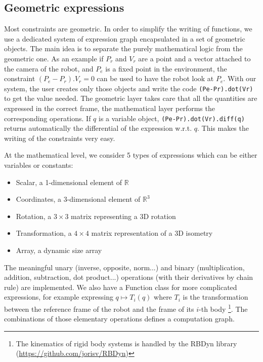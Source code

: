 \subsection{Geometric expressions}

Most constraints are geometric.
In order to simplify the writing of functions, we use a dedicated system of expression graph encapsulated in a set of geometric objects.
The main idea is to separate the purely mathematical logic from the geometric one. As an example if $P_r$ and $V_r$ are a point and a vector attached to the camera of the robot, and $P_e$ is a fixed point in the environment, the constraint $(P_e - P_r).V_r = 0$ can be used to have the robot look at $P_e$. With our system, the user creates only those objects and write the code {\tt (Pe-Pr).dot(Vr)} to get the value needed. The geometric layer takes care that all the quantities are expressed in the correct frame, the mathematical layer performs the corresponding operations. If $q$ is a variable object, {\tt (Pe-Pr).dot(Vr).diff(q)} returns automatically the differential of the expression w.r.t. $q$. This makes the writing of the constraints very easy.

At the mathematical level, we consider 5 types of expressions which can be either variables or constants:
\begin{itemize}
  \item Scalar, a 1-dimensional element of $\mathbb{R}$
  \item Coordinates, a 3-dimensional element of $\mathbb{R}^3$
  \item Rotation, a $3\times3$ matrix representing a 3D rotation
  \item Transformation, a $4\times4$ matrix representation of a 3D isometry
  \item Array, a dynamic size array
\end{itemize}
The meaningful unary (inverse, opposite, norm...) and binary (multiplication, addition, subtraction, dot product...) operations (with their derivatives by chain rule) are implemented.
We also have a Function class for more complicated expressions, for example expressing $q \mapsto T_i(q)$ where $T_i$ is the transformation between the reference frame of the robot and the frame of its $i$-th body \footnote{The kinematics of rigid body systems is handled by the RBDyn library (\url{https://github.com/jorisv/RBDyn})}. 
The combinations of those elementary operations defines a computation graph.%

